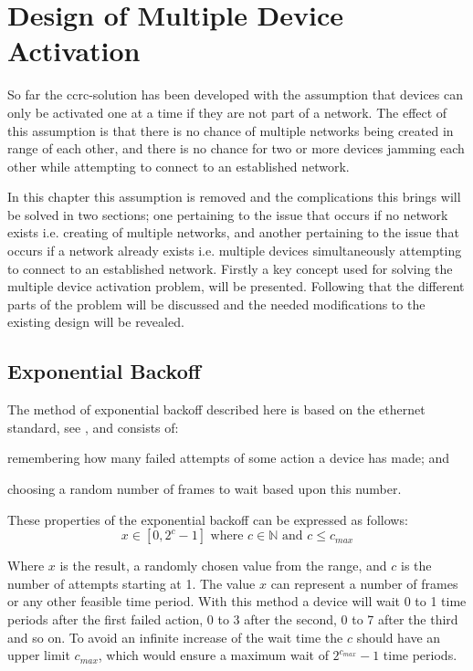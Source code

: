 \chapter{Design of Multiple Device Activation}\label{chap:MDA-CCRC}
So far the \gls{ccrc}-solution has been developed with the assumption that devices can only be activated one at a time if they are not part of a network.
The effect of this assumption is that there is no chance of multiple networks being created in range of each other, and there is no chance for two or more devices jamming each other while attempting to connect to an established network.

In this chapter this assumption is removed and the complications this brings will be solved in two sections; one pertaining to the issue that occurs if no network exists i.e. creating of multiple networks, and another pertaining to the issue that occurs if a network already exists i.e. multiple devices simultaneously attempting to connect to an established network.
Firstly a key concept used for solving the multiple device activation problem, will be presented.
Following that the different parts of the problem will be discussed and the needed modifications to the existing design will be revealed.

\section{Exponential Backoff} %
\label{sec:exponential_backoff}
The method of exponential backoff described here is based on the ethernet standard, see \citep{Ebackoff}, and consists of:
\begin{enumerate*}[label=\itshape \alph*\upshape)]
    \item remembering how many failed attempts of some action a device has made; and
    \item choosing a random number of frames to wait based upon this number.   
\end{enumerate*}
These properties of the exponential backoff can be expressed as follows:
\begin{equation}
     x \in [0, 2^c - 1] \text{ where } c \in \mathbb{N} \text{ and } {c \leq c_{max}}
\end{equation}

Where $x$ is the result, a randomly chosen value from the range, and $c$ is the number of attempts starting at 1. 
The value $x$ can represent a number of frames or any other feasible time period.
With this method a device will wait 0 to 1 time periods after the first failed action, 0 to 3 after the second, 0 to 7 after the third and so on. 
To avoid an infinite increase of the wait time the $c$ should have an upper limit $c_{max}$, which would ensure a maximum wait of $2^{c_{max}}-1$ time periods.

